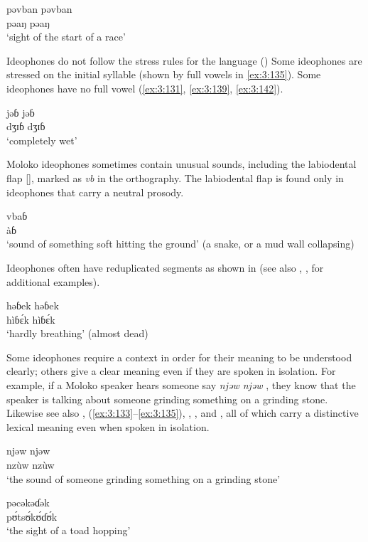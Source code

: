 \ea \label{ex:3:138}
\gll pəvban  pəvban\\
  pə\dentalflap aŋ  pə\dentalflap aŋ\\
\glt  ‘sight of the start of a race’
\z

Ideophones do not follow the stress rules for the language () Some ideophones are stressed on the initial syllable (shown by full vowels in \ref{ex:3:135}). Some ideophones have no full vowel (\ref{ex:3:131}, \ref{ex:3:139}, \ref{ex:3:142}). 

\ea \label{ex:3:139}
\gll jəɓ  jəɓ\\
  dʒɪɓ dʒɪɓ\\
\glt  ‘completely wet’
\z

Moloko ideophones sometimes contain unusual sounds, including the labiodental flap [\dentalflap ], marked as \textit{vb} in the orthography. The labiodental flap is found only in ideophones that carry a neutral prosody. 

\ea \label{ex:3:140}
\gll vbaɓ\\
  \dentalflap àɓ\\
\glt  ‘sound of something soft hitting the ground’ (a snake, or a mud wall collapsing)
\z

Ideophones often have reduplicated segments as shown in  (see also , ,  for additional examples).

\ea \label{ex:3:141}
\gll həɓek  həɓek\\
  hìɓ\'{ɛ}k   hìɓ\'{ɛ}k\\
\glt  ‘hardly breathing’ (almost dead)
\z

Some ideophones require a context in order for their meaning to be understood clearly; others give a clear meaning even if they are spoken in isolation. For example, if a Moloko speaker hears someone say \textit{njəw njəw} , they know that the speaker is talking about someone grinding something on a grinding stone. Likewise see also , (\ref{ex:3:133}--\ref{ex:3:135}), , , and , all of which carry a distinctive lexical meaning even when spoken in isolation. 

\ea \label{ex:3:142}
\gll njəw  njəw\\
  nzùw  nzùw\\
\glt  ‘the sound of someone grinding something on a grinding stone’
\z

\ea \label{ex:3:143}
\gll pəcəkəɗək\\
  p\'{ʊ}ts\'{ʊ}k\'{ʊ}ɗ\'{ʊ}k\\
\glt  ‘the sight of a toad hopping’
\z

